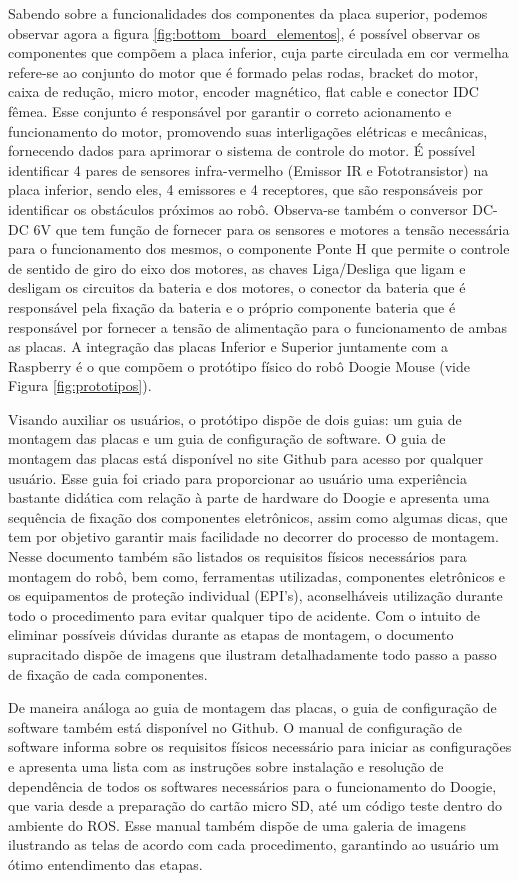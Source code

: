 Sabendo sobre a funcionalidades dos componentes da placa superior, podemos observar agora a figura \ref{fig:bottom_board_elementos}, é possível observar os componentes que compõem a placa inferior, cuja parte circulada em cor vermelha refere-se ao conjunto do motor que é formado pelas rodas, bracket do motor, caixa de redução, micro motor, encoder magnético, flat cable e conector IDC fêmea. Esse conjunto é responsável por garantir o correto acionamento e funcionamento do motor, promovendo suas interligações elétricas e mecânicas, fornecendo dados para aprimorar o sistema de controle do motor. É possível identificar 4 pares de sensores infra-vermelho (Emissor IR e Fototransistor) na placa inferior, sendo eles, 4 emissores e 4 receptores, que são responsáveis por identificar os obstáculos próximos ao robô. Observa-se também o conversor DC-DC 6V que tem função de fornecer para os sensores e motores a tensão necessária para o funcionamento dos mesmos, o componente Ponte H que permite o controle de sentido de giro do eixo dos motores, as chaves Liga/Desliga que ligam e desligam os circuitos da bateria e dos motores, o conector da bateria que é responsável pela fixação da bateria e o próprio componente bateria que é responsável por fornecer a tensão de alimentação para o funcionamento de ambas as placas. A integração das placas Inferior e Superior juntamente com a Raspberry é o que compõem o protótipo físico do robô Doogie Mouse (vide Figura \ref{fig:prototipos}).


Visando auxiliar os usuários, o protótipo dispõe de dois guias: um guia de montagem das placas e um guia de configuração de software. O guia de montagem das placas está disponível no site Github para acesso por qualquer usuário. Esse guia foi criado para proporcionar ao usuário uma experiência bastante didática com relação à parte de hardware do Doogie e apresenta uma sequência de fixação dos componentes eletrônicos, assim como algumas dicas, que tem por objetivo garantir mais facilidade no decorrer do processo de montagem. Nesse documento também são listados os requisitos físicos necessários para montagem do robô, bem como, ferramentas utilizadas, componentes eletrônicos e os equipamentos de proteção individual (EPI’s), aconselháveis utilização durante todo o procedimento para evitar qualquer tipo de acidente. Com o intuito de eliminar possíveis dúvidas durante as etapas de montagem, o documento supracitado dispõe de imagens que ilustram detalhadamente todo passo a passo de fixação de cada componentes. 

De maneira análoga ao guia de montagem das placas, o guia de configuração de software também está disponível no Github. O manual de configuração de software informa sobre os requisitos físicos necessário para iniciar as configurações e apresenta uma lista com as instruções sobre instalação e resolução de dependência de todos os softwares necessários para o funcionamento do Doogie, que varia desde a preparação do cartão micro SD, até um código teste dentro do ambiente do ROS. Esse manual também dispõe de uma galeria de imagens ilustrando as telas de acordo com cada procedimento, garantindo ao usuário um ótimo entendimento das etapas.


